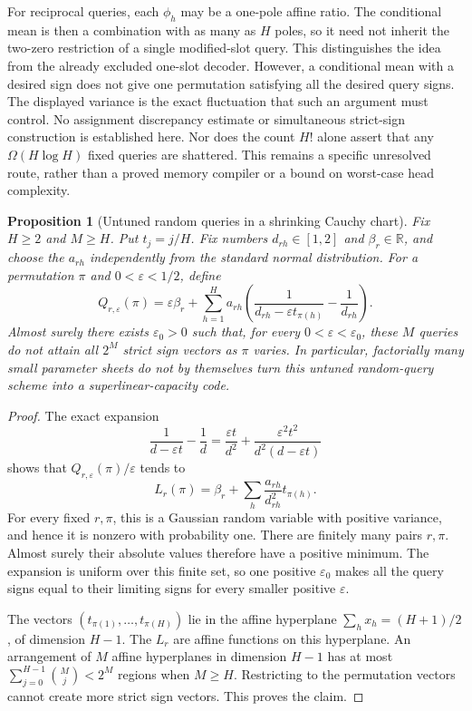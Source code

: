 \documentclass[11pt]{article}
\newtheorem{proposition}{Proposition}
\begin{document}
For reciprocal queries, each $\phi_h$ may be a one-pole affine
ratio. The conditional mean is then a combination with as many as
$H$ poles, so it need not inherit the two-zero restriction of a
single modified-slot query. This distinguishes the idea from the
already excluded one-slot decoder. However, a conditional mean
with a desired sign does not give one permutation satisfying all
the desired query signs. The displayed variance is the exact
fluctuation that such an argument must control. No assignment
discrepancy estimate or simultaneous strict-sign construction is
established here. Nor does the count $H!$ alone assert that any
$\Omega(H\log H)$ fixed queries are shattered. This remains a
specific unresolved route, rather than a proved memory compiler or
a bound on worst-case head complexity.

\begin{proposition}[Untuned random queries in a shrinking Cauchy chart]
\label{prop:random-small-chart}
Fix $H\ge2$ and $M\ge H$. Put $t_j=j/H$. Fix numbers
$d_{rh}\in[1,2]$ and $\beta_r\in\mathbb R$, and choose the
$a_{rh}$ independently from the standard normal distribution.
For a permutation $\pi$ and $0<\varepsilon<1/2$, define
\[
 Q_{r,\varepsilon}(\pi)=\varepsilon\beta_r+
 \sum_{h=1}^H a_{rh}
 \left(\frac1{d_{rh}-\varepsilon t_{\pi(h)}}
                         -\frac1{d_{rh}}\right).
\]
Almost surely there exists $\varepsilon_0>0$ such that, for every
$0<\varepsilon<\varepsilon_0$, these $M$ queries do not attain
all $2^M$ strict sign vectors as $\pi$ varies. In particular,
factorially many small parameter sheets do not by themselves turn
this untuned random-query scheme into a superlinear-capacity code.
\end{proposition}
\begin{proof}
The exact expansion
\[
 \frac1{d-\varepsilon t}-\frac1d
 =\frac{\varepsilon t}{d^2}
   +\frac{\varepsilon^2t^2}{d^2(d-\varepsilon t)}
\]
shows that $Q_{r,\varepsilon}(\pi)/\varepsilon$ tends to
\[
 L_r(\pi)=\beta_r+
      \sum_h \frac{a_{rh}}{d_{rh}^2}t_{\pi(h)}.
\]
For every fixed $r,\pi$, this is a Gaussian random variable with
positive variance, and hence it is nonzero with probability one.
There are finitely many pairs $r,\pi$. Almost surely their absolute
values therefore have a positive minimum. The expansion is uniform
over this finite set, so one positive $\varepsilon_0$ makes all the
query signs equal to their limiting signs for every smaller positive
$\varepsilon$.

The vectors $(t_{\pi(1)},\ldots,t_{\pi(H)})$ lie in the affine
hyperplane $\sum_h x_h=(H+1)/2$, of dimension $H-1$. The $L_r$
are affine functions on this hyperplane. An arrangement of $M$
affine hyperplanes in dimension $H-1$ has at most
$\sum_{j=0}^{H-1}\binom Mj<2^M$ regions when $M\ge H$.
Restricting to the permutation vectors cannot create more strict
sign vectors. This proves the claim.
\end{proof}
\end{document}
